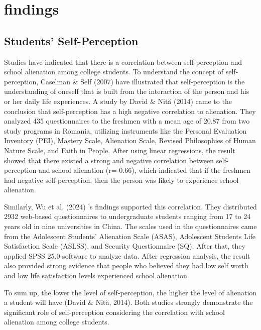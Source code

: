 \documentclass{scupi_apa_thesis}
\begin{document}
\section{findings}
\subsection{Students’ Self-Perception }
\par
Studies have indicated that there is a correlation between self-perception and school 
alienation among college students. To understand the concept of self-perception, Caselman \& 
Self (2007) have illustrated that self-perception is the understanding of oneself that is built from 
the interaction of the person and his or her daily life experiences. A study by David \& Nită 
(2014) came to the conclusion that self-perception has a high negative correlation to alienation. 
They analyzed 435 questionnaires to the freshmen with a mean age of 20.87 from two study 
programs in Romania, utilizing instruments like the Personal Evaluation Inventory (PEI), 
Mastery Scale, Alienation Scale, Revised Philosophies of Human Nature Scale, and Faith in 
People.  After using linear regressions, the result showed that there existed a strong and negative 
correlation between self-perception and school alienation (r=-0.66), which indicated that if the 
freshmen had negative self-perception, then the person was likely to experience school 
alienation.
\par
Similarly, Wu et al. (2024) ’s findings supported this correlation. They distributed 2932 
web-based questionnaires to undergraduate students ranging from 17 to 24 years old in nine 
universities in China. The scales used in the questionnaires came from the Adolescent Students’ 
Alienation Scale (ASAS), Adolescent Students Life Satisfaction Scale (ASLSS), and Security 
Questionnaire (SQ). After that, they applied SPSS 25.0 software to analyze data. 
After regression analysis, the result also provided strong evidence that people who believed they had low self
worth and low life satisfaction levels experienced school alienation. 
\par
To sum up, the lower the level of self-perception, the higher the level of alienation a 
student will have (David \& Nită, 2014). Both studies strongly demonstrate the significant role of 
self-perception considering the correlation with school alienation among college students.
\end{document}
